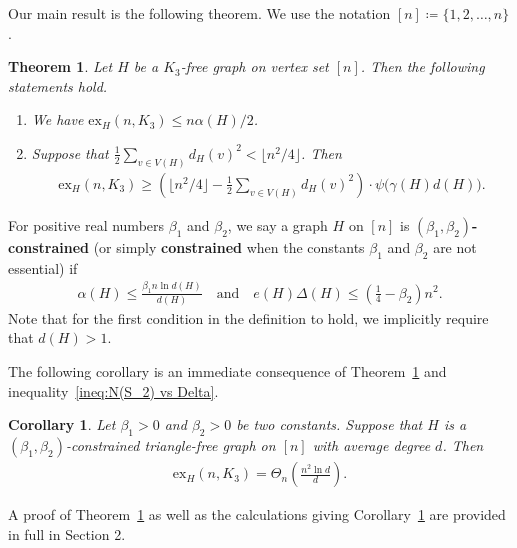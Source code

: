 \documentclass[11pt,a4paper]{article}
\newtheorem{theorem}[definition]{Theorem}
\newtheorem{corollary}[definition]{Corollary}
\newcommand{\graph}{H}
\begin{document}
Our main result is the following theorem. We use the notation $[n] \coloneq \{1,2,\ldots,n\}$. 
\begin{theorem}\label{THM:ex-B-general-bounds}
    Let $\graph$ be a $K_{3}$-free graph on vertex set $[n]$. 
    Then the following statements hold. 
    \begin{enumerate}[label=(\roman*)]
        \item\label{THM:ex-B-general-bounds-a} We have $\mathrm{ex}_{\graph}(n, K_{3}) \le {n \alpha(\graph)}/{2}$. 
        \item\label{THM:ex-B-general-bounds-b} Suppose that $ \frac{1}{2} \sum_{v\in V(\graph)} d_{\graph}(v)^2  < \lfloor n^2/4 \rfloor$. Then 
        \begin{align*}
            \mathrm{ex}_{\graph}(n, K_{3})
            \ge \left(\lfloor n^2/4 \rfloor -  \frac{1}{2} \sum_{v\in V(\graph)} d_{\graph}(v)^2 \right) \cdot \psi\big( \gamma(\graph) d(\graph)\big).
        \end{align*}
    \end{enumerate}
\end{theorem}

For positive real numbers $\beta_1$ and $\beta_2$, we say a graph $\graph$ on $[n]$ is \textbf{$(\beta_1, \beta_2)$-constrained} (or simply \textbf{constrained} when the constants $\beta_1$ and $\beta_2$ are not essential) if 
\begin{align*}
    \alpha(\graph) \le  \frac{\beta_1 n \ln d(\graph)}{d(\graph)} 
    \quad\text{and}\quad 
    e(\graph) \Delta(\graph) \le \left(\frac{1}{4} - \beta_2 \right) n^2.
\end{align*}
Note that for the first condition in the definition to hold, we implicitly require that $d(\graph) > 1$.

The following corollary is an immediate consequence of Theorem~\ref{THM:ex-B-general-bounds} and inequality~\eqref{ineq:N(S_2) vs Delta}. 

\begin{corollary}\label{CORO:ramsey-graph}
    Let $\beta_1 > 0$ and $\beta_2 > 0$ be two constants. 
    Suppose that $\graph$ is a $(\beta_1, \beta_2)$-constrained triangle-free graph on $[n]$ with average degree $d$. 
    Then 
    \begin{align*}
        \mathrm{ex}_{\graph}(n, K_{3}) 
        = \Theta_{n}\left(\frac{n^2 \ln  d}{d}\right).
    \end{align*}
\end{corollary}
A proof of Theorem~\ref{THM:ex-B-general-bounds} as well as the calculations giving Corollary~\ref{CORO:ramsey-graph} are provided in full in Section 2.
\end{document}

